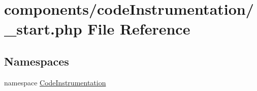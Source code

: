 \hypertarget{components_2code_instrumentation_2__start_8php}{
\section{components/codeInstrumentation/\_\-start.php File Reference}
\label{components_2code_instrumentation_2__start_8php}
}
\subsection*{Namespaces}
\begin{CompactItemize}
\item 
namespace \hyperlink{namespace_code_instrumentation}{CodeInstrumentation}
\end{CompactItemize}
